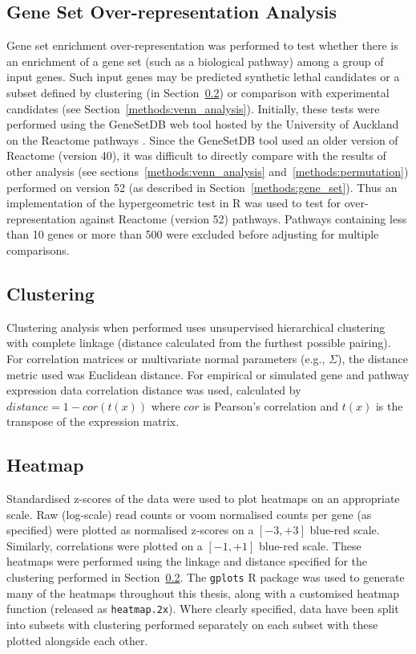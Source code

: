 \subsection{Gene Set Over-representation Analysis} \label{methods:enrichment}
Gene set enrichment over-representation was performed to test whether there is an enrichment of a gene set (such as a biological pathway) among a group of input genes. Such input genes may be predicted synthetic lethal candidates or a subset defined by clustering (in Section~\ref{methods:clustering}) or comparison with experimental candidates (see Section~\ref{methods:venn_analysis}). Initially, these tests were performed using the GeneSetDB web tool \citep{genesetdb} hosted by the University of Auckland on the Reactome pathways \citep{Reactome}. Since the GeneSetDB tool used an older version of Reactome (version 40), it was difficult to directly compare with the results of other analysis (see sections~\ref{methods:venn_analysis} and~\ref{methods:permutation}) performed on version 52 (as described in  Section~\ref{methods:gene_set}). Thus an implementation of the hypergeometric test in R \citep{R_core} was used to test for over-representation against Reactome (version 52) pathways. Pathways containing less than 10 genes or more than 500 \citep[as performed in GeneSetDB by][]{genesetdb} were excluded before adjusting for multiple comparisons.

\subsection{Clustering} \label{methods:clustering}
Clustering analysis when performed uses unsupervised hierarchical clustering with complete linkage (distance calculated from the furthest possible pairing). For correlation matrices or multivariate normal parameters (e.g., $\Sigma$), the distance metric used was Euclidean distance. For empirical or simulated gene and pathway expression data correlation distance was used, calculated by $distance = 1 - cor(t(x))$ where $cor$ is Pearson's correlation and $t(x)$ is the transpose of the expression matrix. 

\subsection{Heatmap} \label{methods:heatmap}
Standardised z-scores of the data were used to plot heatmaps on an appropriate scale. Raw (log-scale) read counts or voom normalised counts per gene (as specified) were plotted  as normalised z-scores on a $[-3,+3]$ blue-red scale. Similarly, correlations were plotted on a $[-1,+1]$ blue-red scale. These heatmaps were performed using the linkage and distance specified for the clustering performed in Section~\ref{methods:clustering}. The \texttt{gplots} R package \citep{gplots} was used to generate many of the heatmaps throughout this thesis, along with a customised heatmap function (released as \texttt{heatmap.2x}). Where clearly specified, data have been split into subsets with clustering performed separately on each subset with these plotted alongside each other.

